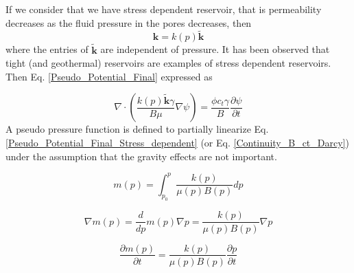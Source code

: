 \documentclass{llncs}
\numberwithin{equation}{section}
\numberwithin{figure}{section}
\numberwithin{table}{section}
\begin{document}
    If we consider that we have stress dependent reservoir, that is permeability decreases as the fluid pressure in the pores decreases, then
    \begin{equation*}
        \mathbf{k}=k\left( p \right)\widetilde{\mathbf{k}}
    \end{equation*}      
        where the entries of $\widetilde{\mathbf{k}}$ are independent of pressure. It has been observed that tight (and geothermal) reservoirs are  examples of stress dependent reservoirs. Then Eq. \ref{Pseudo_Potential_Final}  expressed as
        
    \begin{equation}
        \nabla \cdot \left( \frac{k\left( p \right)\widetilde{\mathbf{k}}\gamma }{B\mu }\nabla \psi  \right)=\frac{\phi {{c}_{t}}\gamma }{B}\frac{\partial \psi }{\partial t}
    \label{Pseudo_Potential_Final_Stress_dependent}
    \end{equation}
    A pseudo pressure function is defined to partially linearize Eq. \ref{Pseudo_Potential_Final_Stress_dependent} (or Eq. \ref{Continuity_B_ct_Darcy}) under the assumption that the gravity effects are not important.
    
    \begin{equation}
        m\left( p \right)=\int_{{{p}_{0}}}^{p}{\frac{k\left( p \right)}{\mu \left( p \right)B\left( p \right)}dp}
    \label{Pseudo_Pressure}
    \end{equation}    
    
    \begin{equation}
        \nabla m\left( p \right)=\frac{d}{dp}m\left( p \right)\nabla p=\frac{k\left( p \right)}{\mu \left( p \right)B\left( p \right)}\nabla p
    \label{Pseudo_Pressure_1}
    \end{equation}     

    \begin{equation}
        \frac{\partial m\left( p \right)}{\partial t}=\frac{k\left( p \right)}{\mu \left( p \right)B\left( p \right)}\frac{\partial p}{\partial t}
    \label{Pseudo_Pressure_2}
    \end{equation}      
    
\end{document}
